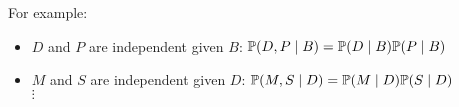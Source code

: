	\begin{frame}[fragile]
		For example:
		\begin{figure}
			\centering
			
		\end{figure}
		\begin{block}{}
			\begin{itemize}
				\item $D$ and $P$ are independent given $B$: $\P( D , P \mid B ) = \P( D \mid B ) \P( P \mid B )$
				\item $M$ and $S$ are independent given $D$: $\P( M , S \mid D ) = \P( M \mid D ) \P( S \mid D )$
				\\$\vdots$
			\end{itemize}
		\end{block}
	\end{frame}